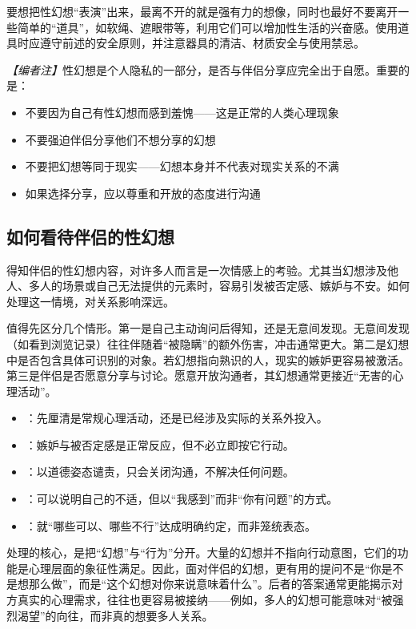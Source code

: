 要想把性幻想“表演”出来，最离不开的就是强有力的想像，同时也最好不要离开一些简单的“道具”，如软绳、遮眼带等，利用它们可以增加性生活的兴奋感。使用道具时应遵守前述的安全原则，并注意器具的清洁、材质安全与使用禁忌。

\noindent\textit{【编者注】}性幻想是个人隐私的一部分，是否与伴侣分享应完全出于自愿。重要的是：
\begin{itemize}
  \item 不要因为自己有性幻想而感到羞愧——这是正常的人类心理现象
  \item 不要强迫伴侣分享他们不想分享的幻想
  \item 不要把幻想等同于现实——幻想本身并不代表对现实关系的不满
  \item 如果选择分享，应以尊重和开放的态度进行沟通
\end{itemize}

\subsection{如何看待伴侣的性幻想}

得知伴侣的性幻想内容，对许多人而言是一次情感上的考验。尤其当幻想涉及他人、多人的场景或自己无法提供的元素时，容易引发被否定感、嫉妒与不安。如何处理这一情境，对关系影响深远。

值得先区分几个情形。第一是自己主动询问后得知，还是无意间发现。无意间发现（如看到浏览记录）往往伴随着“被隐瞒”的额外伤害，冲击通常更大。第二是幻想中是否包含具体可识别的对象。若幻想指向熟识的人，现实的嫉妒更容易被激活。第三是伴侣是否愿意分享与讨论。愿意开放沟通者，其幻想通常更接近“无害的心理活动”。

\begin{itemize}
  \item {}：先厘清是常规心理活动，还是已经涉及实际的关系外投入。
  \item {}：嫉妒与被否定感是正常反应，但不必立即按它行动。
  \item {}：以道德姿态谴责，只会关闭沟通，不解决任何问题。
  \item {}：可以说明自己的不适，但以“我感到”而非“你有问题”的方式。
  \item {}：就“哪些可以、哪些不行”达成明确约定，而非笼统表态。
\end{itemize}

处理的核心，是把“幻想”与“行为”分开。大量的幻想并不指向行动意图，它们的功能是心理层面的象征性满足。因此，面对伴侣的幻想，更有用的提问不是“你是不是想那么做”，而是“这个幻想对你来说意味着什么”。后者的答案通常更能揭示对方真实的心理需求，往往也更容易被接纳——例如，多人的幻想可能意味对“被强烈渴望”的向往，而非真的想要多人关系。

